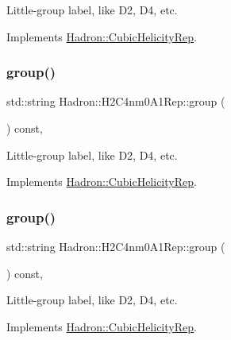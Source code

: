 Little-\/group label, like D2, D4, etc. 

Implements \mbox{\hyperlink{structHadron_1_1CubicHelicityRep_a101a7d76cd8ccdad0f272db44b766113}{Hadron\+::\+Cubic\+Helicity\+Rep}}.

\mbox{\label{structHadron_1_1H2C4nm0A1Rep_ae21ccc52d2b7461dd5dddbfa46b8f878}} 
\subsubsection{\texorpdfstring{group()}{group()}\hspace{0.1cm}{\footnotesize\ttfamily [3/5]}}
{\footnotesize\ttfamily std\+::string Hadron\+::\+H2\+C4nm0\+A1\+Rep\+::group (\begin{DoxyParamCaption}{ }\end{DoxyParamCaption}) const\hspace{0.3cm}{\ttfamily [inline]}, {\ttfamily [virtual]}}

Little-\/group label, like D2, D4, etc. 

Implements \mbox{\hyperlink{structHadron_1_1CubicHelicityRep_a101a7d76cd8ccdad0f272db44b766113}{Hadron\+::\+Cubic\+Helicity\+Rep}}.

\mbox{\label{structHadron_1_1H2C4nm0A1Rep_ae21ccc52d2b7461dd5dddbfa46b8f878}} 
\subsubsection{\texorpdfstring{group()}{group()}\hspace{0.1cm}{\footnotesize\ttfamily [4/5]}}
{\footnotesize\ttfamily std\+::string Hadron\+::\+H2\+C4nm0\+A1\+Rep\+::group (\begin{DoxyParamCaption}{ }\end{DoxyParamCaption}) const\hspace{0.3cm}{\ttfamily [inline]}, {\ttfamily [virtual]}}

Little-\/group label, like D2, D4, etc. 

Implements \mbox{\hyperlink{structHadron_1_1CubicHelicityRep_a101a7d76cd8ccdad0f272db44b766113}{Hadron\+::\+Cubic\+Helicity\+Rep}}.

